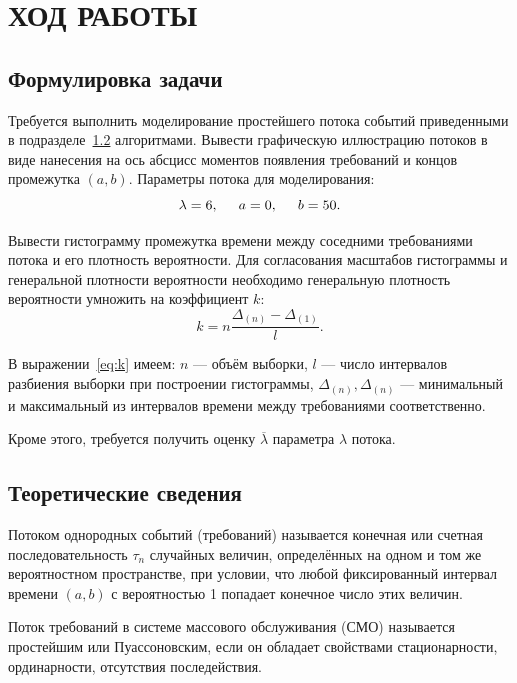 \section{ХОД РАБОТЫ}

\subsection{Формулировка задачи}

Требуется выполнить моделирование простейшего потока событий
приведенными в подразделе~\ref{subs:theory} алгоритмами. Вывести графическую
иллюстрацию потоков в виде нанесения на ось абсцисс моментов появления
требований и концов промежутка $(a,b)$. Параметры потока для моделирования:
\begin{equation*}
  \lambda = 6, \hspace{5mm} a = 0, \hspace{5mm} b = 50.
\end{equation*}

Вывести гистограмму промежутка времени между соседними требованиями потока
и его плотность вероятности. Для согласования масштабов гистограммы и генеральной
плотности вероятности необходимо генеральную плотность вероятности умножить на
коэффициент $k$:
\begin{equation}
\label{eq:k}
  k = n \dfrac{\Delta_{(n)} - \Delta_{(1)}}{l}.
\end{equation}

В выражении~\ref{eq:k} имеем: $n$ --- объём выборки, $l$ --- число интервалов разбиения
выборки при построении гистограммы, $ \Delta_{(n)}, \Delta_{(n)} $ ---
минимальный и максимальный из интервалов времени между требованиями соответственно.

Кроме этого, требуется получить оценку $\overline{\lambda}$ параметра $\lambda$ потока. 


\subsection{Теоретические сведения}
\label{subs:theory}

Потоком однородных событий (требований) называется конечная или счетная
последовательность $\tau_n$ случайных величин, определённых на одном и том же
вероятностном пространстве, при условии, что любой фиксированный интервал времени
$(a,b)$ с вероятностью 1 попадает конечное число этих величин.

Поток требований в системе массового обслуживания (СМО) называется простейшим
или Пуассоновским, если он обладает свойствами стационарности, ординарности,
отсутствия последействия.

